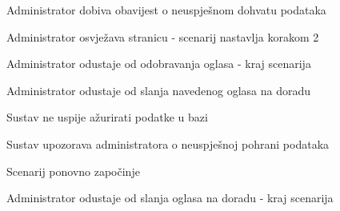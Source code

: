 \begin{packed_item}
\begin{packed_item}
\begin{packed_enum}
								\item Administrator dobiva obavijest o neuspješnom dohvatu podataka
								\item
									\begin{packed_enum}
										\item Administrator osvježava stranicu - scenarij nastavlja korakom 2
										\item Administrator odustaje od odobravanja oglasa - kraj scenarija
									\end{packed_enum}	
							\end{packed_enum}
							\item[5.a]  Administrator odustaje od slanja navedenog oglasa na doradu
							\item[6.a] Sustav ne uspije ažurirati podatke u bazi
							\item[] \begin{packed_enum}
								\item Sustav upozorava administratora o neuspješnoj pohrani podataka 
								\item
									\begin{packed_enum}
										\item Scenarij ponovno započinje
										\item Administrator odustaje od slanja oglasa na doradu - kraj scenarija
									\end{packed_enum}
								\end{packed_enum}					
						\end{packed_item}
					\end{packed_item}

